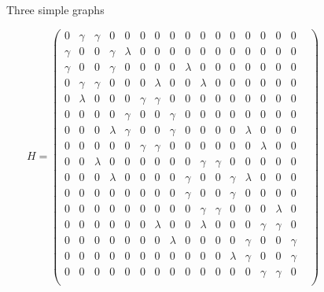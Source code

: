 \begin{figure}[h!]
        \caption{Three simple graphs}
        \label{fig:three graphs}
\end{figure}
    
    \begin{equation} 
         H = 
     \begin{pmatrix}
        0 & \gamma & \gamma & 0 & 0 & 0 & 0 & 0 & 0 & 0 & 0 & 0 & 0 & 0 & 0 & 0 & \\
        \gamma & 0 & 0 & \gamma &\lambda & 0 & 0 & 0 & 0 & 0 & 0 & 0 & 0 & 0 & 0 & 0  \\
        \gamma & 0 & 0 & \gamma & 0 & 0 & 0 & 0 & \lambda & 0 & 0 & 0 & 0 & 0 & 0 & 0 \\
        0 & \gamma & \gamma & 0 & 0 & 0 & \lambda & 0 & 0 & \lambda & 0 & 0 & 0 & 0 & 0 & 0 \\
        0 & \lambda & 0 & 0 & 0 & \gamma & \gamma & 0 & 0 & 0 & 0 & 0 & 0 & 0 & 0 & 0 \\
        0 & 0 & 0 & 0 & \gamma & 0 & 0 & \gamma & 0 & 0 & 0 & 0 & 0 & 0 & 0 & 0 \\
        0 & 0 & 0 & \lambda & \gamma & 0 & 0 & \gamma & 0 & 0 & 0 & 0 & \lambda & 0 & 0 & 0 \\
        0 & 0 & 0 & 0 & 0 & \gamma & \gamma & 0 & 0 & 0 & 0 & 0 & 0 &\lambda & 0 & 0 \\
        
        0 & 0 & \lambda & 0 & 0 & 0 & 0 & 0 & 0 & \gamma & \gamma & 0 & 0 &0 & 0 & 0 \\
        0 & 0 & 0 & \lambda & 0 & 0 & 0 & 0 & \gamma & 0 & 0 & \gamma  & \lambda & 0 & 0 & 0 \\
        0 & 0 & 0 & 0 & 0 & 0 & 0 & 0 & \gamma & 0 & 0 & \gamma  &0 & 0 & 0 & 0 \\
        0 & 0 & 0 & 0 & 0 & 0 & 0 & 0 & 0 & \gamma & \gamma & 0 & 0 &0 & \lambda  & 0 \\
        
        0 & 0 & 0 & 0 & 0 & 0 & \lambda & 0 & 0 & \lambda & 0 & 0 & 0 & \gamma & \gamma & 0 \\
        0 & 0 & 0 & 0 & 0 & 0 & 0 & \lambda & 0 & 0 & 0 & 0 & \gamma & 0 & 0 & \gamma  \\
        0 & 0 & 0 & 0 & 0 & 0 & 0 & 0 & 0 & 0 & 0 & \lambda & \gamma & 0 & 0 & \gamma \\
        0 & 0 & 0 & 0 & 0 & 0 & 0 & 0 & 0 & 0 & 0 & 0 & 0 & \gamma & \gamma & 0 \\
        
    \end{pmatrix}
    \end{equation}
    
